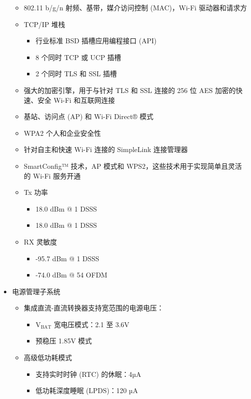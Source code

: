 \documentclass[a4paper]{ctexart}
\begin{document}
\begin{itemize}
\begin{itemize}
      \item 802.11 b/g/n 射频、基带，媒介访问控制 (MAC)，Wi-Fi 驱动器和请求方
      \item TCP/IP 堆栈
      \begin{itemize}
        \item 行业标准 BSD 插槽应用编程接口 (API)
        \item 8 个同时 TCP 或 UCP 插槽
        \item 2 个同时 TLS 和 SSL 插槽
      \end{itemize}
      \item 强大的加密引擎，用于与针对 TLS 和 SSL 连接的 256 位 AES 加密的快速、安全 Wi-Fi 和互联网连接
      \item 基站、访问点 (AP) 和 Wi-Fi Direct® 模式
      \item WPA2 个人和企业安全性
      \item 针对自主和快速 Wi-Fi 连接的 SimpleLink 连接管理器
      \item SmartConfig™ 技术，AP 模式和 WPS2，这些技术用于实现简单且灵活的 Wi-Fi 服务开通
      \item Tx 功率
      \begin{itemize}
        \item 18.0 dBm @ 1 DSSS
        \item 18.0 dBm @ 1 DSSS
      \end{itemize}
      \item RX 灵敏度
      \begin{itemize}
        \item -95.7 dBm @ 1 DSSS
        \item -74.0 dBm @ 54 OFDM
      \end{itemize}
    \end{itemize}
    \item 电源管理子系统
    \begin{itemize}
      \item 集成直流-直流转换器支持宽范围的电源电压：
      \begin{itemize}
        \item $\mathrm{V_{BAT}}$ 宽电压模式：2.1 至 3.6V
        \item 预稳压 1.85V 模式
      \end{itemize}
      \item 高级低功耗模式
      \begin{itemize}
        \item 支持实时时钟 (RTC) 的休眠：4µA
        \item 低功耗深度睡眠 (LPDS)：120 µA

\end{itemize}
\end{itemize}
\end{itemize}
\end{document}
